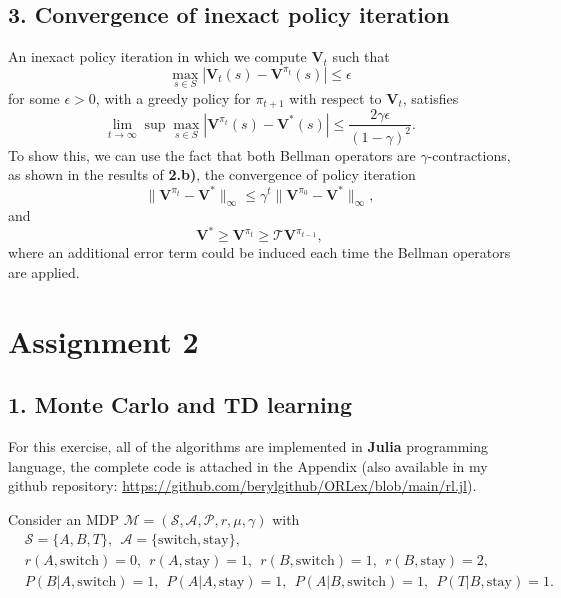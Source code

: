 \documentclass[12pt]{article}
\begin{document}
\subsection*{3. Convergence of inexact policy iteration}
An inexact policy iteration in which we compute $\mathbf{V}_t$ such that
\begin{equation*}
    \max_{s \in S}\left|\mathbf{V}_t(s) - \mathbf{V}^{\pi_t}(s)\right| \leq \epsilon
\end{equation*}
for some $\epsilon > 0$, with a greedy policy for $\pi_{t+1}$ with respect to $\mathbf{V}_t$, satisfies
\begin{equation}
    \lim_{t \rightarrow \infty} \sup \max_{s \in S}\left| \mathbf{V}^{\pi_t}(s) - \mathbf{V}^*(s)\right| \leq \frac{2\gamma\epsilon}{(1-\gamma)^2}.
\end{equation}
To show this, we can use the fact that both Bellman operators are $\gamma$-contractions, as shown in the results of \textbf{2.b)}, the convergence of policy iteration
\begin{equation*}
    \|\mathbf{V}^{\pi_t} - \mathbf{V}^*\|_\infty \leq \gamma^t\|\mathbf{V}^{\pi_0} - \mathbf{V}^*\|_\infty,
\end{equation*}
and
\begin{equation*}
    \mathbf{V}^* \geq \mathbf{V}^{\pi_t} \geq \mathcal{T}\mathbf{V}^{\pi_{t-1}},
\end{equation*}
where an additional error term could be induced each time the Bellman operators are applied.

\section*{Assignment 2}
\subsection*{1. Monte Carlo and TD learning}
For this exercise, all of the algorithms are implemented in \textbf{Julia} programming language, the complete code is attached in the Appendix (also available in my github repository: \url{https://github.com/berylgithub/ORLex/blob/main/rl.jl}).

Consider an MDP $\mathcal{M} = (\mathcal{S}, \mathcal{A}, \mathcal{P}, r,\mu, \gamma)$ with
\begin{equation*}
    \begin{split}
        &\mathcal{S} = \{A,B,T\}, ~~ \mathcal{A} = \{\text{switch},\text{stay}\}, \\
        &r(A, \text{switch})=0, ~~ r(A, \text{stay})=1, ~~ r(B, \text{switch})=1, ~~ r(B, \text{stay})=2, \\
        &P(B|A, \text{switch})=1, ~~ P(A|A, \text{stay})=1, ~~P(A|B, \text{switch})=1, ~~P(T|B, \text{stay})=1.
    \end{split}
\end{equation*}
\end{document}

